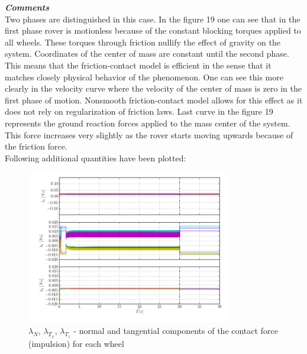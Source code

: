 \noindent \textbf{\textit{\Large{Comments}}}\\[1mm]
\noindent Two phases are distinguished in this case. In the figure 19 one can see that in the first phase rover is motionless because of the constant blocking torques applied to all wheels.
These torques through friction nullify the effect of gravity on the system. Coordinates of the center of mass are constant until the second phase. This means that the friction-contact model is efficient in the sense
that it matches closely physical behavior of the phenomenon. One can see this more clearly in the velocity curve where the velocity of the center of mass is zero in the first phase of motion.
Nonsmooth friction-contact model allows for this effect as it does not rely on regularization of friction laws. Last curve in the figure 19 represents the ground reaction forces applied to the mass center of the system. 
This force increases very slightly as the rover starts moving upwards because of the friction force.\\

\noindent Following additional quantities have been plotted:

\begin{figure}[H]
  \centering
    \includegraphics[width=0.8\textwidth]{lambdaNTS4}
  \caption{$\lambda_{N}$, $\lambda_{T_x}$, $\lambda_{T_z}$ - normal and tangential components of the contact force (impulsion) for each wheel}
\end{figure}

